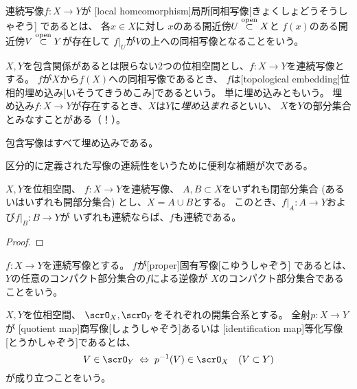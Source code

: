 \documentclass[report]{jlreq}
\begin{document}
\begin{definition}[局所同相写像]
    連続写像$f \colon X \to Y$が
    [local homeomorphism]{局所同相写像}[きょくしょどうそうしゃぞう]
    であるとは、
    各$x \in X$に対し
    $x$のある開近傍$U \stackrel{\text{open}}{\subset} X$と
    $f(x)$のある開近傍$V \stackrel{\text{open}}{\subset} Y$が存在して
    $f|_U$が$V$の上への同相写像となることをいう。
\end{definition}

\begin{definition}[位相的埋め込み]
    $X, Y$を包含関係があるとは限らない2つの位相空間とし、$f \colon X \to Y$を連続写像とする。
    $f$が$X$から$f(X)$への同相写像であるとき、
    $f$は[topological embedding]{位相的埋め込み}[いそうてきうめこみ]であるという。
    単に埋め込みともいう。
    埋め込み$f \colon X \to Y$が存在するとき、$X$は$Y$に\emph{埋め込まれる}といい、
    $X$を$Y$の部分集合とみなすことがある（！）。
\end{definition}

\begin{example}[埋め込みの例]
    包含写像はすべて埋め込みである。
\end{example}

区分的に定義された写像の連続性をいうために便利な補題が次である。

\begin{lemma}[貼り合わせ補題]
    $X, Y$を位相空間、
    $f \colon X \to Y$を連続写像、
    $A, B \subset X$をいずれも閉部分集合
    (あるいはいずれも開部分集合) とし、$X = A \cup B$とする。
    このとき、$f|_A \colon A \to Y$および$f|_B \colon B \to Y$が
    いずれも連続ならば、$f$も連続である。
\end{lemma}

\begin{proof}
    \TODO{}
\end{proof}


\begin{definition}[固有写像]
    $f \colon X \to Y$を連続写像とする。
    $f$が[proper]{固有写像}[こゆうしゃぞう]
    であるとは、
    $Y$の任意のコンパクト部分集合の$f$による逆像が
    $X$のコンパクト部分集合であることをいう。
\end{definition}

\begin{definition}[商写像]
    $X, Y$を位相空間、
    $\scrO_X, \scrO_Y$をそれぞれの開集合系とする。
    全射$p \colon X \to Y$が
    [quotient map]{商写像}[しょうしゃぞう]あるいは
    [identification map]{等化写像}[とうかしゃぞう]であるとは、
    \begin{equation}
        V \in \scrO_Y
        \; \Leftrightarrow \;
        p^{-1}(V) \in \scrO_X
        \quad (V \subset Y)
    \end{equation}
    が成り立つことをいう。
\end{definition}
\end{document}
